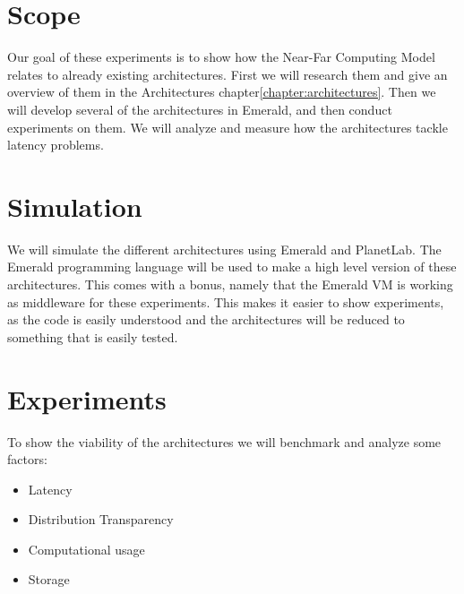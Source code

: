
\section{Scope}
Our goal of these experiments is to show how the Near-Far Computing Model relates to already existing architectures. First we will research them and give an overview of them in the Architectures chapter\ref{chapter:architectures}. Then we will develop several of the architectures in Emerald, and then conduct experiments on them. We will analyze and measure how the architectures tackle latency problems. 





\section{Simulation}
We will simulate the different architectures using Emerald and PlanetLab. The Emerald programming language will be used to make a high level version of these architectures. This comes with a bonus, namely that the Emerald VM is working as middleware for these experiments. This makes it easier to show experiments, as the code is easily understood and the architectures will be reduced to something that is easily tested.








\section{Experiments}
To show the viability of the architectures we will benchmark and analyze some factors:
\begin{itemize}
    \item Latency
    \item Distribution Transparency
    \item Computational usage
    \item Storage
\end{itemize}




